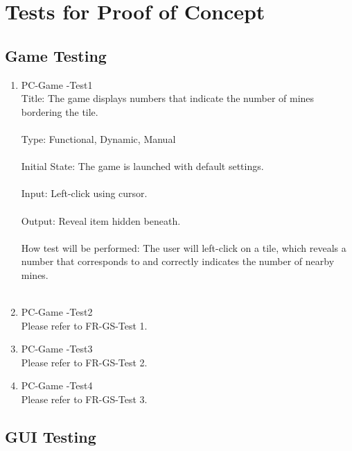 \documentclass[12pt, titlepage]{article}
\begin{document}
\newpage
\section{Tests for Proof of Concept}

\subsection{Game Testing}
\begin{enumerate}

\item{PC-Game	-Test1\\}
Title: The game displays numbers that indicate the number of mines bordering the tile.\\\\
Type: Functional, Dynamic, Manual\\\\
Initial State: The game is launched with default settings.\\\\
Input: Left-click using cursor.\\\\
Output: Reveal item hidden beneath.\\\\
How test will be performed: The user will left-click on a tile, which reveals a number that corresponds to and correctly indicates the number of nearby mines.\\\\

\item{PC-Game	-Test2\\}
Please refer to FR-GS-Test 1.\\

\item{PC-Game	-Test3\\}
Please refer to FR-GS-Test 2.\\

\item{PC-Game	-Test4\\}
Please refer to FR-GS-Test 3.\\

\end{enumerate}

\newpage
\subsection{GUI Testing}
\end{document}
